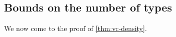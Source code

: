 \subsection{Bounds on the number of types}%



We now come to the proof of \autoref{thm:vc-density}.
%
%
%
